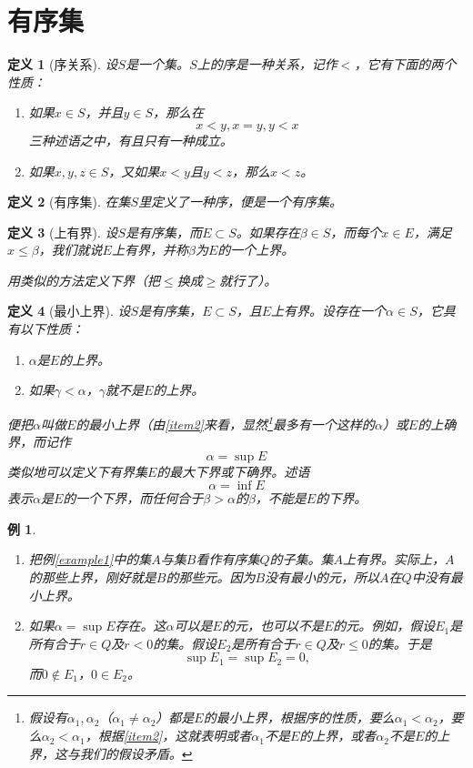 \documentclass[a4paper,UTF8]{ctexbook}
\newtheorem{example}{例}[chapter]
\newtheorem{definition}{定义}[chapter]
\begin{document}
\section{有序集}

\begin{definition}[序关系]
设$S$是一个集。$S$上的序是一种关系，记作$<$，它有下面的两个性质：
\begin{enumerate}
\item 如果$x \in S$，并且$y \in S$，那么在$$x < y, x = y, y < x$$三种述语之中，有且只有一种成立。
\item 如果$x, y, z \in S$，又如果$x < y$且$y < z$，那么$x < z$。
\end{enumerate}
\end{definition}

\begin{definition}[有序集]
在集$S$里定义了一种序，便是一个有序集。
\end{definition}

\begin{definition}[上有界]
设$S$是有序集，而$E \subset S$。如果存在$\beta \in S$，而每个$x \in E$，满足$x \leqslant \beta$，我们就说$E$上有界，并称$\beta$为$E$的一个上界。

用类似的方法定义下界（把$\leqslant$换成$\geqslant$就行了）。
\end{definition}

\begin{definition}[最小上界]
设$S$是有序集，$E \subset S$，且$E$上有界。设存在一个$\alpha \in S$，它具有以下性质：
\begin{enumerate}
\item $\alpha$是$E$的上界。
\item 如果$\gamma < \alpha$，$\gamma$就不是$E$的上界。\label{item2}
\end{enumerate}
便把$\alpha$叫做$E$的最小上界（由\ref{item2}来看，显然\footnote{假设有$\alpha_1,\alpha_2$（$\alpha_1 \neq \alpha_2$）都是$E$的最小上界，根据序的性质，要么$\alpha_1 < \alpha_2$，要么$\alpha_2 < \alpha_1$，根据\ref{item2}，这就表明或者$\alpha_1$不是$E$的上界，或者$\alpha_2$不是$E$的上界，这与我们的假设矛盾。}最多有一个这样的$\alpha$）或$E$的上确界，而记作$$\alpha = \sup{E}$$
类似地可以定义下有界集$E$的最大下界或下确界。述语$$\alpha = \inf{E}$$表示$\alpha$是$E$的一个下界，而任何合于$\beta > \alpha$的$\beta$，不能是$E$的下界。
\end{definition}

\begin{example}
\label{example2}\hfill
\begin{enumerate}[a]
\item 把例\ref{example1}中的集$A$与集$B$看作有序集$Q$的子集。集$A$上有界。实际上，$A$的那些上界，刚好就是$B$的那些元。因为$B$没有最小的元，所以$A$在$Q$中没有最小上界。\label{item1}
\item 如果$\alpha = \sup{E}$存在。这$\alpha$可以是$E$的元，也可以不是$E$的元。例如，假设$E_1$是所有合于$r \in Q$及$r < 0$的集。假设$E_2$是所有合于$r \in Q$及$r \leqslant 0$的集。于是$$\sup{E_1} = \sup{E_2} = 0,$$而$0 \notin E_1$，$0 \in E_2$。
\end{enumerate}
\end{example}
\end{document}
